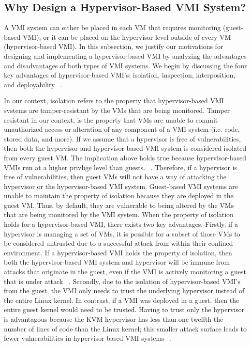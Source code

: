 \documentclass{report}
\begin{document}
\begin{spacing}{1.5}
\subsection{Why Design a Hypervisor-Based VMI System?}

{\large
A VMI system can either be placed in each VM that requires monitoring (guest-based VMI), or it can be placed on the hypervisor level outside of every VM (hypervisor-based VMI). In this subsection, we justify our motivations for designing and implementing a hypervisor-based VMI by analyzing the advantages and disadvantages of both types of VMI systems. We begin by discussing the four key advantages of hypervisor-based VMI's: isolation, inspection, interposition, and deployability ~\cite{pfoh2009formal}.
\newline
}


{\large
\noindent In our context, isolation refers to the property that hypervisor-based VMI systems are tamper-resistant by the VMs that are being monitored. Tamper resistant in our context, is the property that VMs are unable to commit unauthorized access or alteration of any component of a VMI system (i.e. code, stored data, and more). If we assume that a hypervisor is free of vulnerabilities, then both the hypervisor and hypervisor-based VMI system is considered isolated from every guest VM. The implication above holds true because hypervisor-based VMIs run at a higher privlige level than guests. ~\cite{hebbal2015virtual}. Therefore, if a hypervisor is free of vulnerabilities, then guest VMs will not have a way of attacking the hypervisor or the hypervisor-based VMI system. Guest-based VMI systems are unable to maintain the property of isolation because they are deployed in the guest VM. Thus, by default, they are vulnerable to being altered by the VMs that are being monitored by the VMI system. When the property of isolation holds for a hypervisor-based VMI, there exists two key advantages. Firstly, if a hypervisor is managing a set of VMs, it is possible for a subset of those VMs to be considered untrusted due to a successful attack from within their confined environment. If a hypervisor-based VMI holds the property of isolation, then both the hypervisor-based VMI system and hypervisor will be immune from attacks that originate in the guest, even if the VMI is actively monitoring a guest that is under attack ~\cite{hebbal2015virtual}. Secondly, due to the isolation of hypervisor-based VMI's from the guest, the VMI only needs to trust the underlying hypervisor instead of the entire Linux kernel. In contrast, if a VMI was deployed in a guest, then the entire guest kernel would need to be trusted. Having to trust only the hypervisor is advantagous because the KVM hypervisor has less than one twelfth the number of lines of code than the Linux kernel; this smaller attack surface leads to fewer vulnerabilities in hypervisor-based VMI systems ~\cite{bauman2015survey}.
\newline
}




\end{spacing}
\end{document}
